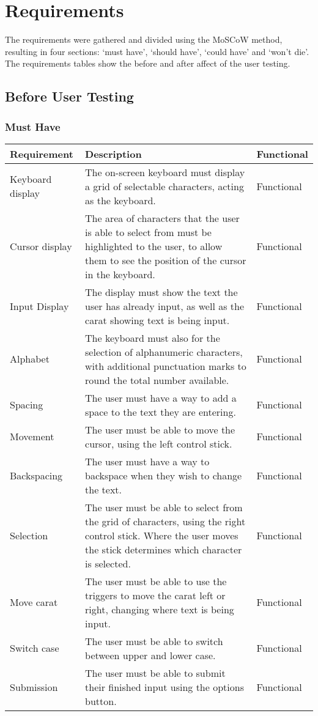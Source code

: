 \documentclass[requirements.tex]{subfiles}
\begin{document}
\section{Requirements} %
\label{sec:requirements}
The requirements were gathered and divided using the MoSCoW method, resulting
in four sections: `must have', `should have', `could have' and `won't die'. The
requirements tables show the before and after affect of the user testing.

\subsection{Before User Testing} %
\label{sub:before_user_testing}
\subsubsection{Must Have} %
\label{ssub:before_must_have}
\begin{table}[H]
\small
\begin{tabularx}{\textwidth}{| l | X | l |}
 \hline
 \textbf{Requirement} & \textbf{Description} & \textbf{Functional} \\
 \hline
 Keyboard display & The on-screen keyboard must display a grid of selectable
 characters, acting as the keyboard. & Functional \\
 \hline
 Cursor display & The area of characters that the user is able to select from
 must be highlighted to the user, to allow them to see the position of the
 cursor in the keyboard. & Functional \\
 \hline
 Input Display & The display must show the text the user has already input, as
 well as the carat showing text is being input. & Functional \\
 \hline
 Alphabet & The keyboard must also for the selection of alphanumeric characters,
 with additional punctuation marks to round the total number available. &
 Functional \\
 \hline
 Spacing & The user must have a way to add a space to the text they are
 entering. & Functional \\
 \hline
 Movement & The user must be able to move the cursor, using the left control
 stick. & Functional \\
 \hline
 Backspacing & The user must have a way to backspace when they wish to change
 the text. & Functional \\
 \hline
 Selection & The user must be able to select from the grid of characters, using
 the right control stick. Where the user moves the stick determines which
 character is selected. & Functional \\
 \hline
 Move carat & The user must be able to use the triggers to move the carat left
 or right, changing where text is being input. & Functional \\
 \hline
 Switch case & The user must be able to switch between upper and lower case.
 & Functional \\
 \hline
 Submission & The user must be able to submit their finished input using the
 options button. & Functional \\
 \hline
\end{tabularx}
\end{table}
\end{document}
